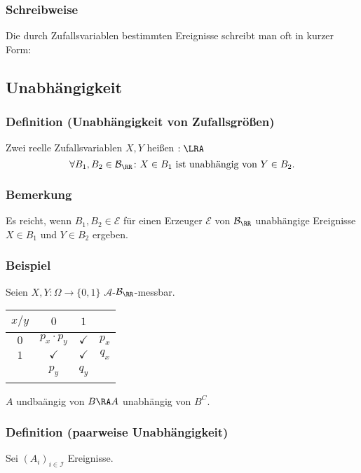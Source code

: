 \subsubsection{Schreibweise}
Die durch Zufallsvariablen bestimmten Ereignisse schreibt man oft in kurzer Form:
\subsection{Unabh\"angigkeit}
\subsubsection{Definition (Unabh\"angigkeit von Zufallsgr\"o\ss{}en)}
Zwei reelle Zufallsvariablen $X,Y$ hei\ss{}en  $:\LRA$
\[\forall B_1,B_2\in\mathcal{B}_\RR\colon X\in B_1\ \text{ist unabh\"angig von}\ Y\in B_2.\]
\subsubsection{Bemerkung}
Es reicht, wenn $B_1,B_2\in\mathcal{E}$ f\"ur einen Erzeuger $\mathcal{E}$ von $\mathcal{B}_\RR$ unabh\"angige Ereignisse $X\in B_1$ und $Y\in B_2$ ergeben.
\subsubsection{Beispiel}
Seien $X,Y\colon\Omega\to\{0,1\}$ $\mathcal{A}$-$\mathcal{B}_\RR$-messbar.
\begin{center}
\begin{tabular}{c|c|c|c}
$x/y$&$0$&$1$&~\\
\hline
$0$&$p_x\cdot p_y$&$\checkmark$&$p_x$\\
\hline
$1$&$\checkmark$&$\checkmark$&$q_x$\\
\hline
~&$p_y$&$q_y$&~
\end{tabular}
\end{center}
$A$ undba\"angig von $B\RA A$ unabh\"angig von $B^C$.
\subsubsection{Definition (paarweise Unabh\"angigkeit)}
Sei $(A_i)_{i\in\mathcal{I}}$ Ereignisse.
